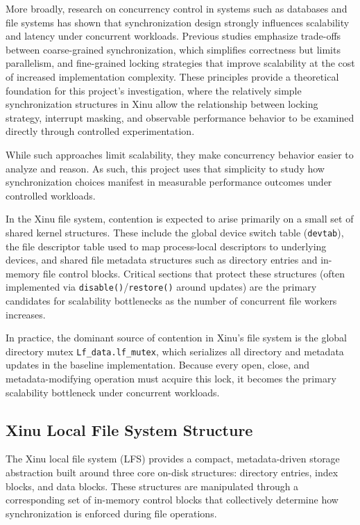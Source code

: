 \documentclass[sigconf]{acmart}
\begin{document}
More broadly, research on concurrency control in systems such as databases and file systems has shown that synchronization design strongly influences scalability and latency under concurrent workloads. Previous studies emphasize trade-offs between coarse-grained synchronization, which simplifies correctness but limits parallelism, and fine-grained locking strategies that improve scalability at the cost of increased implementation complexity. These principles provide a theoretical foundation for this project’s investigation, where the relatively simple synchronization structures in Xinu allow the relationship between locking strategy, interrupt masking, and observable performance behavior to be examined directly through controlled experimentation.

While such approaches limit scalability, they make concurrency behavior easier to analyze and reason. As such, this project uses that simplicity to study how synchronization choices manifest in measurable performance outcomes under controlled workloads.

In the Xinu file system, contention is expected to arise primarily on a small set of shared kernel structures. These include the global device switch table (\texttt{devtab}), the file descriptor table used to map process-local descriptors to underlying devices, and shared file metadata structures such as directory entries and in-memory file control blocks. Critical sections that protect these structures (often implemented via \texttt{disable()}/\texttt{restore()} around updates) are the primary candidates for scalability bottlenecks as the number of concurrent file workers increases.

In practice, the dominant source of contention in Xinu's file system is the global directory mutex \texttt{Lf\_data.}\texttt{lf\_mutex}, which serializes all directory and metadata updates in the baseline implementation. Because every open, close, and metadata-modifying operation must acquire this lock, it becomes the primary scalability bottleneck under concurrent workloads.


\subsection{Xinu Local File System Structure}

The Xinu local file system (LFS) provides a compact, metadata-driven storage abstraction built around three core on-disk structures: directory entries, index blocks, and data blocks. These structures are manipulated through a corresponding set of in-memory control blocks that collectively determine how synchronization is enforced during file operations.
\end{document}
